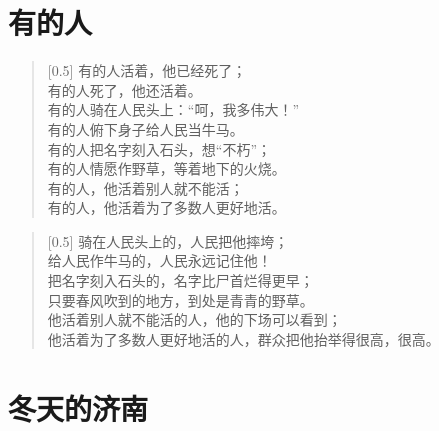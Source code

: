 \documentclass[12pt,UTF-8,openany]{ctexbook}
\begin{document}
\chapter{有的人}

\begin{large}
    
    \begin{verse}[0.5\linewidth]
        有的人活着，他已经死了； \\
        有的人死了，他还活着。 \\
        有的人骑在人民头上：“呵，我多伟大！” \\
        有的人俯下身子给人民当牛马。 \\
        有的人把名字刻入石头，想“不朽”； \\
        有的人情愿作野草，等着地下的火烧。 \\
        有的人，他活着别人就不能活； \\
        有的人，他活着为了多数人更好地活。
    \end{verse}
    
    
    \begin{verse}[0.5\linewidth]
        骑在人民头上的，人民把他摔垮； \\
        给人民作牛马的，人民永远记住他！ \\
        把名字刻入石头的，名字比尸首烂得更早； \\
        只要春风吹到的地方，到处是青青的野草。 \\
        他活着别人就不能活的人，他的下场可以看到； \\
        他活着为了多数人更好地活的人，群众把他抬举得很高，很高。
    \end{verse}
    
\end{large}



\chapter{冬天的济南}
\end{document}
